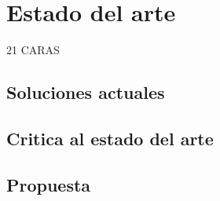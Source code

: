 \chapter{Estado del arte}
\label{ch:estado}
21 CARAS

\section{Soluciones actuales}

\section{Critica al estado del arte}

\section{Propuesta}
